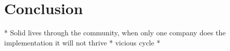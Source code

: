\chapter{Conclusion}

* Solid lives through the community, when only one company does the implementation it will not thrive
* vicious cycle
* 